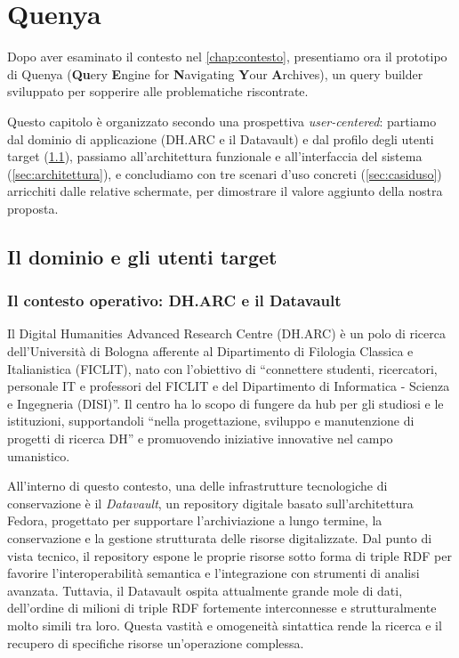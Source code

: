 \chapter{Quenya}\label{chap:prototipo}

    Dopo aver esaminato il contesto nel \cref{chap:contesto}, presentiamo ora il prototipo di Quenya (\textbf{Qu}ery \textbf{E}ngine for \textbf{N}avigating \textbf{Y}our \textbf{A}rchives), un query builder sviluppato per sopperire alle problematiche riscontrate.

    Questo capitolo è organizzato secondo una prospettiva \textit{user-centered}: partiamo dal dominio di applicazione (DH.ARC e il Datavault) e dal profilo degli utenti target (\cref{sec:dominio}), passiamo all'architettura funzionale e all'interfaccia del sistema (\cref{sec:architettura}), e concludiamo con tre scenari d'uso concreti (\cref{sec:casiduso}) arricchiti dalle relative schermate, per dimostrare il valore aggiunto della nostra proposta.

\section{Il dominio e gli utenti target}\label{sec:dominio}

    \subsection{Il contesto operativo: DH.ARC e il Datavault}\label{subsec:dharc}
        Il Digital Humanities Advanced Research Centre (DH.ARC) è un polo di ricerca dell'Università di Bologna afferente al Dipartimento di Filologia Classica e Italianistica (FICLIT), nato con l'obiettivo di ``connettere studenti, ricercatori, personale IT e professori del FICLIT e del Dipartimento di Informatica \-- Scienza e Ingegneria (DISI)''\cite{Ams26}.
        Il centro ha lo scopo di fungere da hub per gli studiosi e le istituzioni, supportandoli ``nella progettazione, sviluppo e manutenzione di progetti di ricerca DH'' e promuovendo iniziative innovative nel campo umanistico.

        All'interno di questo contesto, una delle infrastrutture tecnologiche di conservazione è il \textit{Datavault}, un repository digitale basato sull'architettura Fedora, progettato per supportare l'archiviazione a lungo termine, la conservazione e la gestione strutturata delle risorse digitalizzate. 
        Dal punto di vista tecnico, il repository espone le proprie risorse sotto forma di triple RDF per favorire l'interoperabilità semantica e l'integrazione con strumenti di analisi avanzata.\cite{Far25}
        Tuttavia, il Datavault ospita attualmente grande mole di dati, dell'ordine di milioni di triple RDF fortemente interconnesse e strutturalmente molto simili tra loro.
        Questa vastità e omogeneità sintattica rende la ricerca e il recupero di specifiche risorse un'operazione complessa.

